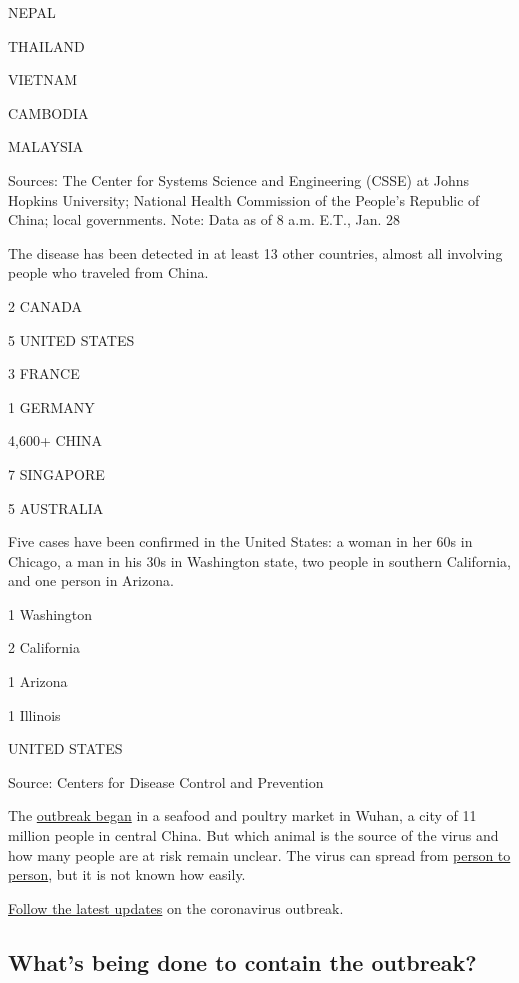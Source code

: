 NEPAL

THAILAND

VIETNAM

CAMBODIA

MALAYSIA

Sources: The Center for Systems Science and Engineering (CSSE) at Johns
Hopkins University; National Health Commission of the People's Republic
of China; local governments. Note: Data as of 8 a.m. E.T., Jan. 28

The disease has been detected in at least 13 other countries, almost all
involving people who traveled from China.

2 CANADA

5 UNITED STATES

3 FRANCE

1 GERMANY

4,600+ CHINA

7 SINGAPORE

5 AUSTRALIA

Five cases have been confirmed in the United States: a woman in her 60s
in Chicago, a man in his 30s in Washington state, two people in southern
California, and one person in Arizona.

1 Washington

2 California

1 Arizona

1 Illinois

UNITED STATES

Source: Centers for Disease Control and Prevention

The
\href{https://www.nytimes.com/2020/01/08/health/china-pneumonia-outbreak-virus.html}{outbreak
began} in a seafood and poultry market in Wuhan, a city of 11 million
people in central China. But which animal is the source of the virus and
how many people are at risk remain unclear. The virus can spread from
\href{https://www.nytimes.com/2020/01/20/world/asia/coronavirus-china-symptoms.html}{person
to person}, but it is not known how easily.

\href{https://www.nytimes.com/2020/01/28/world/asia/china-coronavirus.html}{Follow
the latest updates} on the coronavirus outbreak.

\hypertarget{whats-being-done-to-contain-the-outbreak}{%
\subsection{What's being done to contain the
outbreak?}\label{whats-being-done-to-contain-the-outbreak}}

